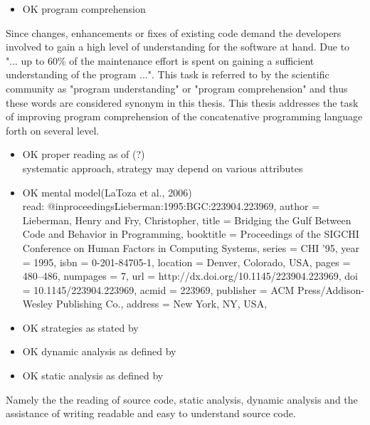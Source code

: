 \begin{itemize}
\item OK program comprehension
\end{itemize}

Since changes, enhancements or fixes of existing code demand the developers involved to gain a high level of understanding for the software at hand. Due to \cite{Cornelissen:2011:CEP:1990772.1991009} "... up to 60\% of the maintenance effort is spent on gaining a sufficient understanding of the program ...". This task is referred to by the scientific community as "program understanding" or "program comprehension" and thus these words are considered synonym in this thesis. This thesis addresses the task of improving program comprehension of the concatenative programming language forth on several level.

\begin{itemize}
\item OK proper reading as of \cite{Basili:1997:EPR:257260.257262}(?) \cite{Robillard:2004:EDI:1042203.1042417} \\ systematic approach, strategy may depend on various attributes

\item OK mental model(LaToza et al., 2006)\\ read: 
@inproceedings{Lieberman:1995:BGC:223904.223969,
author = {Lieberman, Henry and Fry, Christopher},
title = {Bridging the Gulf Between Code and Behavior in Programming},
booktitle = {Proceedings of the SIGCHI Conference on Human Factors in Computing Systems},
series = {CHI '95},
year = {1995},
isbn = {0-201-84705-1},
location = {Denver, Colorado, USA},
pages = {480--486},
numpages = {7},
url = {http://dx.doi.org/10.1145/223904.223969},
doi = {10.1145/223904.223969},
acmid = {223969},
publisher = {ACM Press/Addison-Wesley Publishing Co.},
address = {New York, NY, USA},
}

\item OK strategies as stated by \cite{Storey:1999:CDE:308936.308940}

\item OK dynamic analysis as defined by \cite{Ball:1999:CDA:318774.318944} \cite{Cornelissen:2009:SSP:1638616.1639301}

\item OK static analysis as defined by \cite{Ball:1999:CDA:318774.318944}
\end{itemize}

Namely the the reading of source code, static analysis, dynamic analysis and the assistance of writing readable and easy to understand source code.

